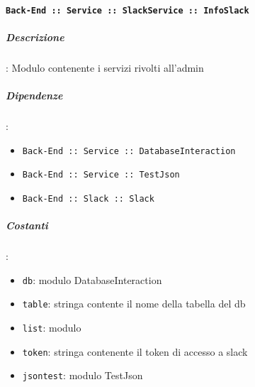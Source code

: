 \documentclass[../DefinizioneDiProdotto_v3.0.0.tex]{subfiles}
\begin{document}
\paragraph{\texttt{Back-End :: Service :: SlackService :: InfoSlack}}
\subparagraph{Descrizione}: Modulo contenente i servizi rivolti all'admin
\subparagraph{Dipendenze}:
\begin{itemize}
	\item \texttt{Back-End :: Service :: DatabaseInteraction}
	\item \texttt{Back-End :: Service :: TestJson}
	\item \texttt{Back-End :: Slack :: Slack}
\end{itemize}
\subparagraph{Costanti}:
\begin{itemize}
	\item \texttt{db}: modulo DatabaseInteraction
	\item \texttt{table}: stringa contente il nome della tabella del db
	\item \texttt{list}: modulo
	\item \texttt{token}: stringa contenente il token di accesso a slack
	\item \texttt{jsontest}: modulo TestJson
\end{itemize}
\end{document}
